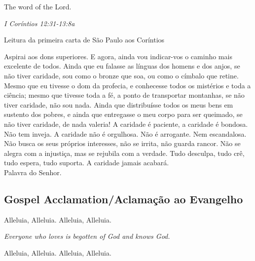 \documentclass[10pt,a4]{article}
\begin{document}
\begin{paracol}{2}
The word of the Lord. 


 \switchcolumn
 \textit{I Coríntios 12:31-13:8a}

\hspace{2em} Leitura da primeira carta de S\~ao Paulo aos Cor\'intios

Aspirai aos dons superiores. E agora, ainda vou indicar-vos o caminho mais excelente de todos.
Ainda que eu falasse as línguas dos homens e dos anjos, se não tiver caridade, sou como o bronze que soa, ou como o címbalo que retine.
Mesmo que eu tivesse o dom da profecia, e conhecesse todos os mistérios e toda a ciência; mesmo que tivesse toda a fé, a ponto de transportar montanhas, se não tiver caridade, não sou nada.
Ainda que distribuísse todos os meus bens em sustento dos pobres, e ainda que entregasse o meu corpo para ser queimado, se não tiver caridade, de nada valeria!
A caridade é paciente, a caridade é bondosa. Não tem inveja. A caridade não é orgulhosa. Não é arrogante.
Nem escandalosa. Não busca os seus próprios interesses, não se irrita, não guarda rancor.
Não se alegra com a injustiça, mas se rejubila com a verdade.
Tudo desculpa, tudo crê, tudo espera, tudo suporta.
A caridade jamais acabará. \\

Palavra do Senhor. 


 \switchcolumn*

\end{paracol}

\begin{center}

\subsection*{Gospel Acclamation/Aclama\c{c}\~ao ao Evangelho}

Alleluia, Alleluia. Alleluia, Alleluia.

\textit{Everyone who loves is begotten of God and knows God.}

Alleluia, Alleluia. Alleluia, Alleluia.

\end{center}
\end{document}
